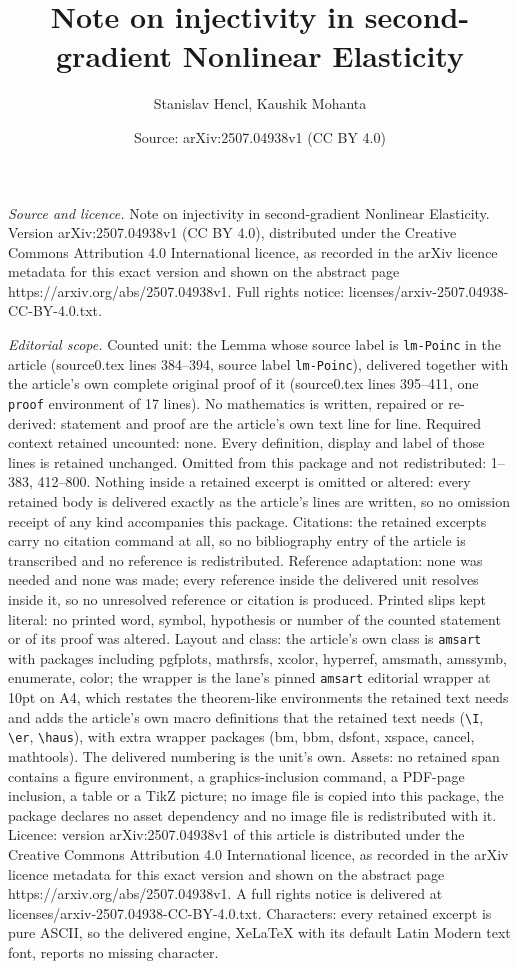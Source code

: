 \documentclass[10pt,a4paper]{amsart}
\title[Note on injectivity in second-gradient Nonlinear Elasticity]{Note on injectivity in second-gradient Nonlinear Elasticity}
\author{Stanislav Hencl, Kaushik Mohanta}
\date{Source: arXiv:2507.04938v1 (CC BY 4.0)}
\begin{document}
\maketitle

\noindent\emph{Source and licence.} Note on injectivity in second-gradient Nonlinear Elasticity. Version arXiv:2507.04938v1 (CC BY 4.0), distributed under the Creative Commons Attribution 4.0 International licence, as recorded in the arXiv licence metadata for this exact version and shown on the abstract page https://arxiv.org/abs/2507.04938v1. Full rights notice: licenses/arxiv-2507.04938-CC-BY-4.0.txt.\par\smallskip

\noindent\textit{Editorial scope.} Counted unit: the Lemma whose source label is \texttt{lm-Poinc} in the article (source0.tex lines 384--394, source label \texttt{lm-Poinc}), delivered together with the article's own complete original proof of it (source0.tex lines 395--411, one \texttt{proof} environment of 17 lines). No mathematics is written, repaired or re-derived: statement and proof are the article's own text line for line. Required context retained uncounted: none. Every definition, display and label of those lines is retained unchanged. Omitted from this package and not redistributed: 1--383, 412--800. Nothing inside a retained excerpt is omitted or altered: every retained body is delivered exactly as the article's lines are written, so no omission receipt of any kind accompanies this package. Citations: the retained excerpts carry no citation command at all, so no bibliography entry of the article is transcribed and no reference is redistributed. Reference adaptation: none was needed and none was made; every reference inside the delivered unit resolves inside it, so no unresolved reference or citation is produced. Printed slips kept literal: no printed word, symbol, hypothesis or number of the counted statement or of its proof was altered. Layout and class: the article's own class is \texttt{amsart} with packages including pgfplots, mathrsfs, xcolor, hyperref, amsmath, amssymb, enumerate, color; the wrapper is the lane's pinned \texttt{amsart} editorial wrapper at 10pt on A4, which restates the theorem-like environments the retained text needs and adds the article's own macro definitions that the retained text needs (\texttt{\textbackslash I}, \texttt{\textbackslash er}, \texttt{\textbackslash haus}), with extra wrapper packages (bm, bbm, dsfont, xspace, cancel, mathtools). The delivered numbering is the unit's own. Assets: no retained span contains a figure environment, a graphics-inclusion command, a PDF-page inclusion, a table or a TikZ picture; no image file is copied into this package, the package declares no asset dependency and no image file is redistributed with it. Licence: version arXiv:2507.04938v1 of this article is distributed under the Creative Commons Attribution 4.0 International licence, as recorded in the arXiv licence metadata for this exact version and shown on the abstract page https://arxiv.org/abs/2507.04938v1. A full rights notice is delivered at licenses/arxiv-2507.04938-CC-BY-4.0.txt. Characters: every retained excerpt is pure ASCII, so the delivered engine, XeLaTeX with its default Latin Modern text font, reports no missing character.
\end{document}
